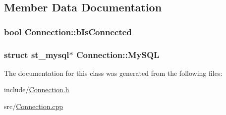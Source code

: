 \subsection{Member Data Documentation}
\hypertarget{class_connection_a67044b1a5d259abaa7f92ab51ef791f9}{}
\subsubsection[{b\+Is\+Connected}]{\setlength{\rightskip}{0pt plus 5cm}bool Connection\+::b\+Is\+Connected\hspace{0.3cm}{\ttfamily [protected]}}\label{class_connection_a67044b1a5d259abaa7f92ab51ef791f9}
\hypertarget{class_connection_a1a7ed2eaaab5159293008dea06dce9e8}{}
\subsubsection[{My\+S\+Q\+L}]{\setlength{\rightskip}{0pt plus 5cm}struct st\+\_\+mysql$\ast$ Connection\+::\+My\+S\+Q\+L\hspace{0.3cm}{\ttfamily [protected]}}\label{class_connection_a1a7ed2eaaab5159293008dea06dce9e8}


The documentation for this class was generated from the following files\+:\begin{DoxyCompactItemize}
\item 
include/\hyperlink{_connection_8h}{Connection.\+h}\item 
src/\hyperlink{_connection_8cpp}{Connection.\+cpp}\end{DoxyCompactItemize}
